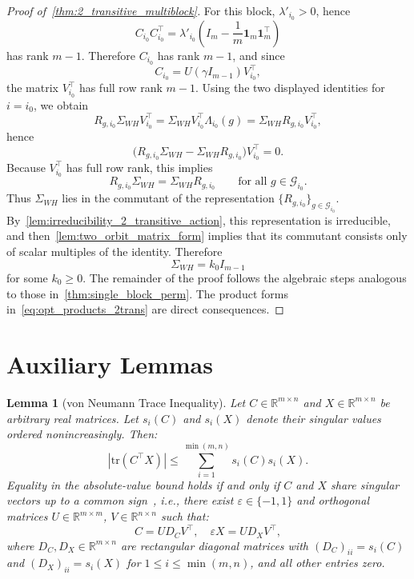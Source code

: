 \documentclass[11pt]{article}
\newtheorem{lemma}{Lemma}
\begin{document}
\begin{proof}[Proof of~\cref{thm:2_transitive_multiblock}]
For this block, \(\lambda'_{i_0}>0\), hence
\[
C_{i_0}C_{i_0}^\top=\lambda'_{i_0} \left(I_m-\frac1m\boldsymbol 1_m\boldsymbol 1_m^\top\right)
\]
has rank \(m-1\). Therefore \(C_{i_0}\) has rank \(m-1\), and since
\[
C_{i_0}=U(\gamma I_{m-1})V_{i_0}^\top,
\]
the matrix \(V_{i_0}^\top\) has full row rank \(m-1\).
Using the two displayed identities for \(i=i_0\), we obtain
\[
R_{g,i_0}\Sigma_{WH}V_{i_0}^\top
=
\Sigma_{WH}V_{i_0}^\top \Lambda_{i_0}(g)
=
\Sigma_{WH}R_{g,i_0}V_{i_0}^\top,
\]
hence
\[
\bigl(R_{g,i_0}\Sigma_{WH}-\Sigma_{WH}R_{g,i_0}\bigr)V_{i_0}^\top=0.
\]
Because \(V_{i_0}^\top\) has full row rank, this implies
\[
R_{g,i_0}\Sigma_{WH}=\Sigma_{WH}R_{g,i_0}
\qquad\text{for all }g\in \mathcal G_{i_0}.
\]
Thus \(\Sigma_{WH}\) lies in the commutant of the representation
\(\{R_{g,i_0}\}_{g\in \mathcal G_{i_0}}\).
By~\cref{lem:irreducibility_2_transitive_action}, this representation is irreducible, and then~\cref{lem:two_orbit_matrix_form} implies that its commutant consists only of scalar multiples of the identity. Therefore
\[
\Sigma_{WH}=k_0 I_{m-1}
\]
for some \(k_0\ge 0\).
The remainder of the proof follows the algebraic steps analogous to those in~\cref{thm:single_block_perm}. The product forms in~\cref{eq:opt_products_2trans} are direct consequences.
\end{proof}

\section{Auxiliary Lemmas}

\begin{lemma}[von Neumann Trace Inequality]
  \label{lem:von_neumann_rectangular}
  Let \(C \in \mathbb{R}^{m \times n}\) and \(X \in \mathbb{R}^{m \times n}\) be arbitrary real matrices. Let \(s_i(C)\) and \(s_i(X)\) denote their singular values ordered nonincreasingly. Then:
  \[
  \left|\mathrm{tr}\left(C^\top X\right)\right|
  \le
  \sum_{i=1}^{\min(m,n)} s_i(C)s_i(X).
  \]
  Equality in the absolute-value bound holds if and only if \(C\) and \(X\) share singular vectors up to a common sign~\citep{carlsson2021neumann}, i.e., there exist \(\varepsilon \in \{-1,1\}\) and orthogonal matrices \(U \in \mathbb{R}^{m \times m}\), \(V \in \mathbb{R}^{n \times n}\) such that:
  \[
  C = U D_C V^\top, \quad
  \varepsilon X = U D_X V^\top,
  \]
  where \(D_C,D_X\in\mathbb{R}^{m\times n}\) are rectangular diagonal matrices with \((D_C)_{ii}=s_i(C)\) and \((D_X)_{ii}=s_i(X)\) for \(1\le i\le \min(m,n)\), and all other entries zero.
\end{lemma}
\end{document}
